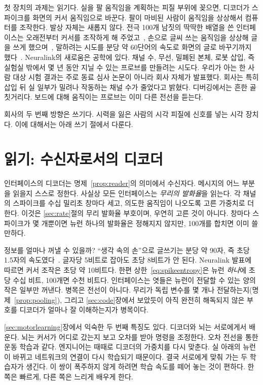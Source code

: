 첫 장치의 과제는 읽기다. 실을 팔 움직임을 계획하는 피질 부위에 꽂으면, 디코더가 스파이크를 화면의 커서 움직임으로 바꾼다. 팔이 마비된 사람이 움직임을 상상해서 컴퓨터를 조작한다. 발상 자체는 새롭지 않다. 전극 100개 남짓의 딱딱한 배열을 쓴 인터페이스는 오래전부터 커서를 조작하게 해 주었고~\cite{Hochberg2006}, 손으로 글씨 쓰는 움직임을 상상해 글을 쓰게 했으며~\cite{Willett2021}, 말하려는 시도를 분당 약 60단어의 속도로 화면의 글로 바꾸기까지 했다~\cite{Willett2023}. Neuralink의 새로움은 공학에 있다. 채널 수, 무선, 밀폐된 본체, 로봇 삽입, 즉 실험실 밖에서 몇 년 동안 지닐 수 있는 프로브를 만들려는 시도다. 우리가 아는 한 사람 대상 시험 결과는 주로 동료 심사 논문이 아니라 회사 자체가 발표했다. 회사는 특히 삽입 뒤 실 일부가 밀려나 작동하는 채널 수가 줄었다고 밝혔다. 디버깅에서는 흔한 골칫거리다. 보드에 대해 움직이는 프로브는 이미 다른 전선을 듣는다.

회사의 두 번째 방향은 쓰기다. 시력을 잃은 사람의 시각 피질에 신호를 넣는 시각 장치다. 이에 대해서는 아래 쓰기 절에서 다룬다.

\section{읽기: 수신자로서의 디코더}

인터페이스의 디코더는 명제~\ref{prop:reader}의 의미에서 수신자다. 메시지의 어느 부분을 읽을지 스스로 정한다. 사실상 모든 인터페이스는 \emph{무리의 발화율}을 읽는다. 각 채널의 스파이크를 수십 밀리초 창마다 세고, 의도한 움직임이 나오도록 고른 가중치로 더한다. 이것은 \ref{sec:rate}절의 무리 발화율 부호이며, 우연히 고른 것이 아니다. 창마다 스파이크가 몇 개뿐이면 뉴런 하나의 발화율은 정해지지 않지만, 100개를 합치면 이미 쓸 만하다.

정보를 얼마나 꺼낼 수 있을까? “생각 속의 손”으로 글쓰기는 분당 약 90자, 즉 초당 1.5자의 속도였다~\cite{Willett2021}. 글자당 5비트로 잡아도 초당 8비트가 안 된다. Neuralink 발표에 따르면 커서 조작은 초당 약 10비트다. 한편 상한~\eqref{eq:spikeentropy}은 뉴런 \emph{하나}에 초당 수십 비트, 100개면 수천 비트다. 인터페이스는 엿들은 뉴런이 전달할 수 있는 양의 작은 일부만 꺼낸다. 병목은 전선이 아니다. 무리가 독립 변수를 몇 개나 전달하는지(명제~\ref{prop:pooling}), 그리고 \ref{sec:code}장에서 보았듯이 아직 완전히 해독되지 않은 부호를 디코더가 얼마나 잘 이해하는지가 병목이다.

\ref{sec:motorlearning}장에서 익숙한 두 번째 특징도 있다. 디코더와 뇌는 서로에게서 배운다. 뇌는 커서가 어디로 갔는지 보고 오차를 받아 명령을 조정한다. 오차 전선을 통한 운동 학습과 같다. 엔지니어는 때때로 디코더의 가중치를 다시 맞춘다. 실 아래의 뉴런이 바뀌고 네트워크의 연결이 다시 학습되기 때문이다. 결국 서로에게 맞춰 가는 두 학습자가 생긴다. 이 쌍이 폭주하지 않게 하려면 학습 속도를 떼어 놓는 것이 편하다. 한쪽은 빠르게, 다른 쪽은 느리게 배우게 한다.

